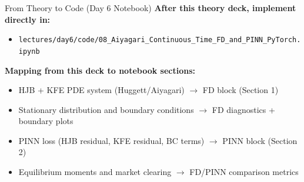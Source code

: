 \documentclass[aspectratio=169,11pt]{beamer}
\begin{document}
\begin{frame}{From Theory to Code (Day 6 Notebook)}
\footnotesize
\textbf{After this theory deck, implement directly in:}
\begin{itemize}\itemsep2pt
    \item \texttt{lectures/day6/code/08\_Aiyagari\_Continuous\_Time\_FD\_and\_PINN\_PyTorch.ipynb}
\end{itemize}

\vspace{0.2em}
\textbf{Mapping from this deck to notebook sections:}
\begin{itemize}\itemsep2pt
    \item HJB + KFE PDE system (Huggett/Aiyagari) $\rightarrow$ FD block (Section 1)
    \item Stationary distribution and boundary conditions $\rightarrow$ FD diagnostics + boundary plots
    \item PINN loss (HJB residual, KFE residual, BC terms) $\rightarrow$ PINN block (Section 2)
    \item Equilibrium moments and market clearing $\rightarrow$ FD/PINN comparison metrics
\end{itemize}
\end{frame}
\end{document}
